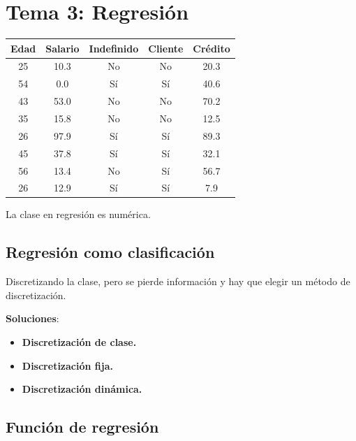 \documentclass[12pt, twoside, openright]{report} %
\begin{document}
\chapter{Tema 3: Regresión}
\begin{table}[h]
	\begin{tabular}{c|c|c|c|c}
		\textbf{Edad} & \textbf{Salario} & \textbf{Indefinido} & \textbf{Cliente} & \textbf{Crédito} \\ \hline
		25            & 10.3             & No                  & No               & 20.3             \\
		54            & 0.0              & Sí                  & Sí               & 40.6             \\
		43            & 53.0             & No                  & No               & 70.2             \\
		35            & 15.8             & No                  & No               & 12.5             \\
		26            & 97.9             & Sí                  & Sí               & 89.3             \\
		45            & 37.8             & Sí                  & Sí               & 32.1             \\
		56            & 13.4             & No                  & Sí               & 56.7             \\
		26            & 12.9             & Sí                  & Sí               & 7.9              \\ \hline
	\end{tabular}
\end{table}
La clase en regresión es numérica.

\section{Regresión como
  clasificación}

Discretizando la clase, pero se pierde información y hay que elegir un
método de discretización.

\textbf{Soluciones}:

\begin{itemize}
	\item \textbf{Discretización de clase.}
	\item \textbf{Discretización fija.}
	\item \textbf{Discretización dinámica.}
\end{itemize}

\section{Función de regresión}
\end{document}
